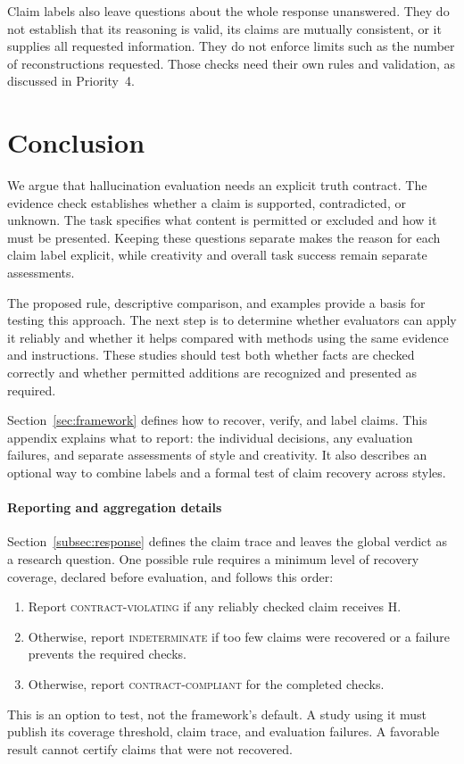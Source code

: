 \documentclass{clv2025}
\begin{document}
Claim labels also leave questions about the whole response unanswered. They
do not establish that its reasoning is valid, its claims are mutually
consistent, or it supplies all requested information. They do not enforce
limits such as the number of reconstructions requested. Those checks need
their own rules and validation, as discussed in Priority~4.


\section{Conclusion}\label{sec:conclusion}

We argue that hallucination evaluation needs an explicit truth contract.
The evidence check establishes whether a claim is supported, contradicted,
or unknown. The task specifies what content is permitted or excluded and how
it must be presented. Keeping these questions separate makes the reason for
each claim label explicit, while creativity and overall task success remain
separate assessments.

The proposed rule, descriptive comparison, and examples provide a
basis for testing this approach. The next step is to determine whether
evaluators can apply it reliably and whether it helps compared with methods
using the same evidence and instructions. These studies should test both
whether facts are checked correctly and whether permitted additions are
recognized and presented as required.
\clearpage

\appendix

%
\makeatletter\def\@currentlabel{A}\makeatother\label{app:diagnostics}

Section~\ref{sec:framework} defines how to recover, verify, and label claims.
This appendix explains what to report: the individual decisions, any
evaluation failures, and separate assessments of style and creativity.
It also describes an optional way to combine labels and a formal test of
claim recovery across styles.


\paragraph{Reporting and aggregation details}
Section~\ref{subsec:response} defines the claim trace and leaves the global
verdict as a research question. One possible rule requires a minimum level
of recovery coverage, declared before evaluation, and follows this order:
\begin{enumerate}
\item Report \textsc{contract-violating} if any reliably checked claim receives H.
\item Otherwise, report \textsc{indeterminate} if too few claims were recovered
or a failure prevents the required checks.
\item Otherwise, report \textsc{contract-compliant} for the completed checks.
\end{enumerate}
This is an option to test, not the framework's default. A study using it must
publish its coverage threshold, claim trace, and evaluation failures. A
favorable result cannot certify claims that were not recovered.
\end{document}
